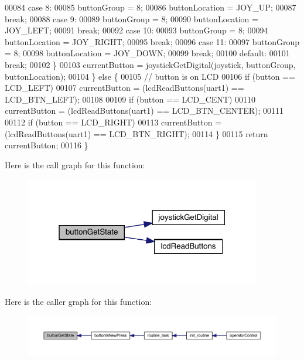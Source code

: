 \begin{DoxyCode}
00084     \textcolor{keywordflow}{case} 8:
00085       buttonGroup = 8;
00086       buttonLocation = JOY\_UP;
00087       \textcolor{keywordflow}{break};
00088     \textcolor{keywordflow}{case} 9:
00089       buttonGroup = 8;
00090       buttonLocation = JOY\_LEFT;
00091       \textcolor{keywordflow}{break};
00092     \textcolor{keywordflow}{case} 10:
00093       buttonGroup = 8;
00094       buttonLocation = JOY\_RIGHT;
00095       \textcolor{keywordflow}{break};
00096     \textcolor{keywordflow}{case} 11:
00097       buttonGroup = 8;
00098       buttonLocation = JOY\_DOWN;
00099       \textcolor{keywordflow}{break};
00100     \textcolor{keywordflow}{default}:
00101       \textcolor{keywordflow}{break};
00102     \}
00103     currentButton = joystickGetDigital(joystick, buttonGroup, buttonLocation);
00104   \} \textcolor{keywordflow}{else} \{
00105     \textcolor{comment}{// button is on LCD}
00106     \textcolor{keywordflow}{if} (button == LCD_LEFT)
00107       currentButton = (lcdReadButtons(uart1) == LCD\_BTN\_LEFT);
00108 
00109     \textcolor{keywordflow}{if} (button == LCD_CENT)
00110       currentButton = (lcdReadButtons(uart1) == LCD\_BTN\_CENTER);
00111 
00112     \textcolor{keywordflow}{if} (button == LCD_RIGHT)
00113       currentButton = (lcdReadButtons(uart1) == LCD\_BTN\_RIGHT);
00114   \}
00115   \textcolor{keywordflow}{return} currentButton;
00116 \}
\end{DoxyCode}
Here is the call graph for this function\+:
\nopagebreak
\begin{figure}[H]
\begin{center}
\leavevmode
\includegraphics[width=292pt]{toggle_8c_ad2b7c969a01f85d57bdca0bc7f5cff81_cgraph}
\end{center}
\end{figure}
Here is the caller graph for this function\+:
\nopagebreak
\begin{figure}[H]
\begin{center}
\leavevmode
\includegraphics[width=350pt]{toggle_8c_ad2b7c969a01f85d57bdca0bc7f5cff81_icgraph}
\end{center}
\end{figure}
\mbox{\label{toggle_8c_a2b3d226371575c894979ab84bce95626}} 
